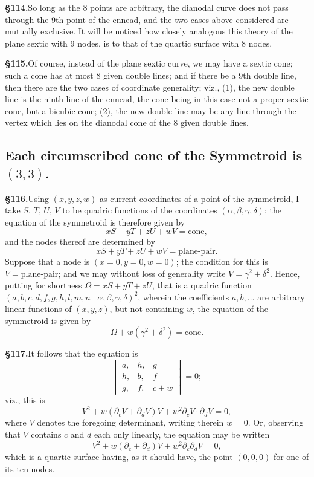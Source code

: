 \documentclass[11pt,a4paper]{article}
\begin{document}
\textbf{\S 114.}\quad So long as the 8 points are arbitrary, the dianodal curve does not pass through the 9th point of the ennead, and the two cases above considered are mutually exclusive. It will be noticed how closely analogous this theory of the plane sextic with 9 nodes, is to that of the quartic surface with 8 nodes.

\textbf{\S 115.}\quad Of course, instead of the plane sextic curve, we may have a sextic cone; such a cone has at most 8 given double lines; and if there be a 9th double line, then there are the two cases of coordinate generality; viz., (1), the new double line is the ninth line of the ennead, the cone being in this case not a proper sextic cone, but a bicubic cone; (2), the new double line may be any line through the vertex which lies on the dianodal cone of the 8 given double lines.

\subsection*{Each circumscribed cone of the Symmetroid is $(3, 3)$.}

\textbf{\S 116.}\quad Using $(x, y, z, w)$ as current coordinates of a point of the symmetroid, I take $S$, $T$, $U$, $V$ to be quadric functions of the coordinates $(\alpha, \beta, \gamma, \delta)$; the equation of the symmetroid is therefore given by
\[
xS + yT + zU + wV = \text{cone},
\]
and the nodes thereof are determined by
\[
xS + yT + zU + wV = \text{plane-pair}.
\]
Suppose that a node is $(x = 0, y = 0, w = 0)$; the condition for this is $V = \text{plane-pair}$; and we may without loss of generality write $V = \gamma^2 + \delta^2$. Hence, putting for shortness $\Omega = xS + yT + zU$, that is a quadric function $(a, b, c, d, f, g, h, l, m, n \mid \alpha, \beta, \gamma, \delta)^2$, wherein the coefficients $a, b, \ldots$ are arbitrary linear functions of $(x, y, z)$, but not containing $w$, the equation of the symmetroid is given by
\[
\Omega + w(\gamma^2 + \delta^2) = \text{cone}.
\]

\textbf{\S 117.}\quad It follows that the equation is
\[
\begin{vmatrix}
a, & h, & g \\
h, & b, & f \\
g, & f, & c + w
\end{vmatrix}
= 0;
\]
viz., this is
\[
V^2 + w(\partial_c V + \partial_d V)V + w^2 \partial_c V \cdot \partial_d V = 0,
\]
where $V$ denotes the foregoing determinant, writing therein $w = 0$. Or, observing that $V$ contains $c$ and $d$ each only linearly, the equation may be written
\[
V^2 + w(\partial_c + \partial_d)V + w^2 \partial_c \partial_d V = 0,
\]
which is a quartic surface having, as it should have, the point $(0, 0, 0)$ for one of its ten nodes.
\end{document}
